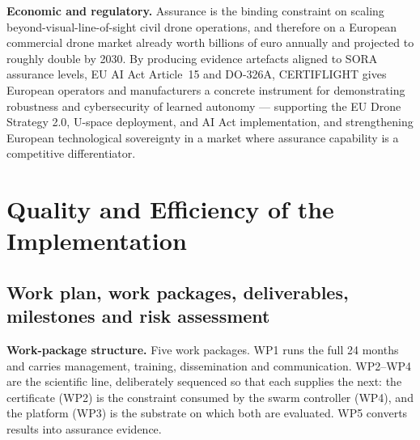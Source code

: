 \documentclass[11pt,a4paper]{article}
\begin{document}
\textbf{Economic and regulatory.} Assurance is the binding constraint on scaling beyond-visual-line-of-sight civil drone operations, and therefore on a European commercial drone market already worth billions of euro annually and projected to roughly double by 2030. By producing evidence artefacts aligned to SORA assurance levels, EU AI Act Article~15 and DO-326A, CERTIFLIGHT gives European operators and manufacturers a concrete instrument for demonstrating robustness and cybersecurity of learned autonomy --- supporting the EU Drone Strategy 2.0, U-space deployment, and AI Act implementation, and strengthening European technological sovereignty in a market where assurance capability is a competitive differentiator.

\section{Quality and Efficiency of the Implementation}

\subsection{Work plan, work packages, deliverables, milestones and risk assessment}

\textbf{Work-package structure.} Five work packages. WP1 runs the full 24 months and carries management, training, dissemination and communication. WP2--WP4 are the scientific line, deliberately sequenced so that each supplies the next: the certificate (WP2) is the constraint consumed by the swarm controller (WP4), and the platform (WP3) is the substrate on which both are evaluated. WP5 converts results into assurance evidence.
\end{document}

